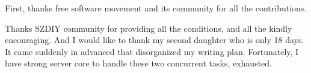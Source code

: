 \documentclass[numbers,numberedpars]{sigplanconf}
\begin{document}
\acks

First, thanks free software movement and its community for all the contributions.

Thanks SZDIY community for providing all the conditions, and all the kindly encouraging. And I would like to thank my second daughter who
is only 18 days. It came suddenly in advanced that disorganized my writing plan. Fortunately, I have strong server core to handle these two
concurrent tasks, exhausted.





\softraggedright


\end{document}
